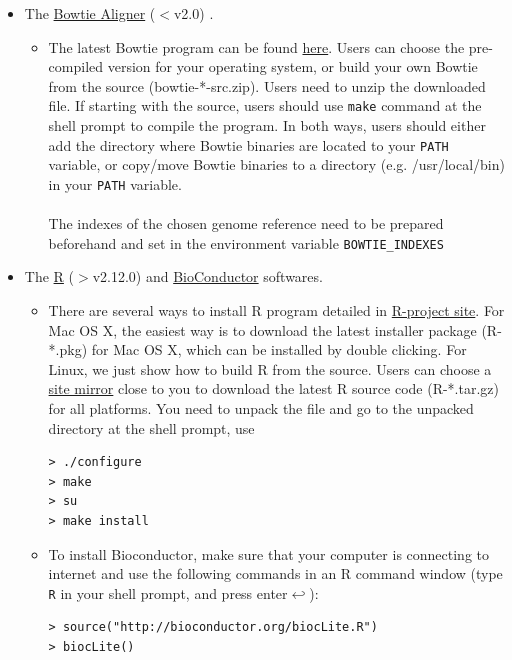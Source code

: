 \documentclass[12pt]{article}
\begin{document}
\begin{itemize}
 \item The \href{http://bowtie-bio.sourceforge.net/manual.shtml}{ Bowtie Aligner} ($<$v2.0) \cite{Langmead2009}.

\begin{itemize}
 \item The latest Bowtie program can be found \href{http://sourceforge.net/projects/bowtie-bio/files/bowtie/0.12.7}{ here}. Users can choose the pre-compiled version for your operating system, or build your own Bowtie from the source (bowtie-*-src.zip). Users need to unzip the downloaded file. If starting with the source, users should use \verb+make+ command at the shell prompt to compile the program. In both ways, users should either add the directory where Bowtie binaries are located to your \verb+PATH+ variable, or copy/move Bowtie binaries to a directory (e.g. /usr/local/bin) in your \verb+PATH+ variable.\\\\
The indexes of the chosen genome reference need to be prepared beforehand and set in the environment variable \verb|BOWTIE_INDEXES|
\end{itemize}

 \item The \href{http://www.r-project.org/}{ R} ($>$v2.12.0) \cite{Rcitation} and \href{http://www.bioconductor.org/}{ BioConductor} \cite{Robert2004} softwares.

\begin{itemize}
 \item There are several ways to install R program detailed in \href{http://cran.r-project.org/doc/manuals/R-admin.html#}{ R-project site}. For Mac OS X, the easiest way is to download the latest installer package (R-*.pkg) for Mac OS X, which can be installed by double clicking.  For Linux, we just show how to build R from the source.  Users can choose a \href{http://cran.r-project.org/mirrors.html}{ site mirror} close to you to download the latest R source code (R-*.tar.gz) for all platforms. You need to unpack the file and go to the unpacked directory at the shell prompt, use
\begin{verbatim}
> ./configure
> make
> su
> make install
\end{verbatim} 
\end{itemize}

\begin{itemize}
 \item To install Bioconductor, make sure that your computer is connecting to internet and use the following commands in an R command window (type \verb+R+ in your shell prompt, and press enter$ \hookleftarrow $):
\begin{verbatim}
> source("http://bioconductor.org/biocLite.R")
> biocLite()
\end{verbatim} 
\end{itemize}


\end{itemize}
\end{document}
